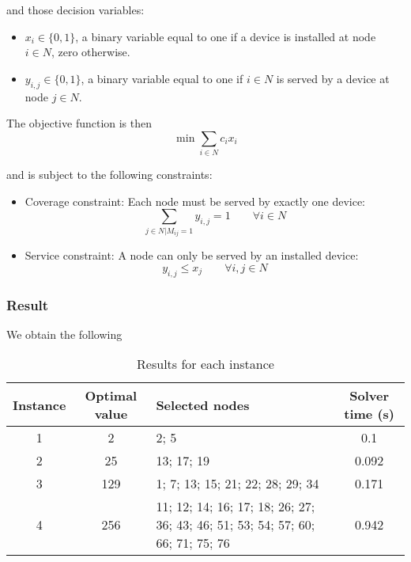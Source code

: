 \documentclass[10pt]{article}
\begin{document}
    and those decision variables:
    \begin{itemize}
        \item $x_i \in \{0,1\}$, a binary variable equal to one if a device is installed at node $i \in N$, zero otherwise.
        \item $y_{i,j} \in \{0,1\}$, a binary variable equal to one if $i \in N$ is served by a device at node $j \in N$.

    \end{itemize}

    The objective function is then
    \begin{equation}
        \min \sum_{i \in N} c_i x_i
    \end{equation}

    and is subject to the following constraints:
    \begin{itemize}
        \item Coverage constraint: Each node must be served by exactly one device:
        \[
            \sum_{j \in N | M_{ij}=1} y_{i,j} = 1 \qquad \forall i \in N
        \]
        \item Service constraint: A node can only be served by an installed device:
        \[
            y_{i,j} \le x_j \qquad \forall i,j \in N
        \]
        
    \end{itemize}

    \subsubsection{Result}
    We obtain the following

    \begin{table}[h!]
        \centering
        \begin{tabularx}{\textwidth}{|c|c|X|c|}
            \hline
            \textbf{Instance} & \textbf{Optimal value} & \textbf{Selected nodes} & \textbf{Solver time (s)} \\
            \hline
            1 & 2 & 2; 5 & 0.1 \\
            \hline
            2 & 25 & 13; 17; 19 & 0.092 \\
            \hline
            3 & 129 & 1; 7; 13; 15; 21; 22; 28; 29; 34 & 0.171 \\
            \hline
            4 & 256 & 11; 12; 14; 16; 17; 18; 26; 27; 36; 43; 46; 51; 53; 54; 57; 60; 66; 71; 75; 76 & 0.942 \\
            \hline
        \end{tabularx}
        \caption{Results for each instance}
        \label{tab:instance_costs}
    \end{table}
\end{document}
